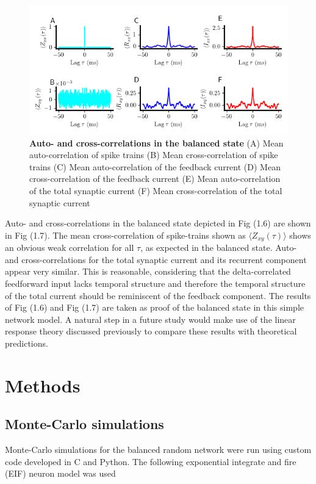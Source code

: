 \documentclass{ucetd}
\begin{document}
\begin{figure}[t!]
\centering
\includegraphics[width=165mm]{figure-12}
\caption{\textbf{Auto- and cross-correlations in the balanced state} (A) Mean auto-correlation of spike trains (B) Mean cross-correlation of spike trains (C) Mean auto-correlation of the feedback current (D) Mean cross-correlation of the feedback current (E) Mean auto-correlation of the total synaptic current (F) Mean cross-correlation of the total synaptic current}
\end{figure}

Auto- and cross-correlations in the balanced state depicted in Fig (1.6) are shown in Fig (1.7). The mean cross-correlation of spike-trains shown as $\langle Z_{xy}(\tau)\rangle$ shows an obvious weak correlation for all $\tau$, as expected in the balanced state. Auto- and cross-correlations for the total synaptic current and its recurrent component appear very similar. This is reasonable, considering that the delta-correlated feedforward input lacks temporal structure and therefore the temporal structure of the total current should be reminiscent of the feedback component. The results of Fig (1.6) and Fig (1.7) are taken as proof of the balanced state in this simple network model. A natural step in a future study would make use of the linear response theory discussed previously to compare these results with theoretical predictions. 

\clearpage
\section{Methods}

\subsection{Monte-Carlo simulations}

Monte-Carlo simulations for the balanced random network were run using custom code developed in C and Python. The following exponential integrate and fire (EIF) neuron model was used
\end{document}

